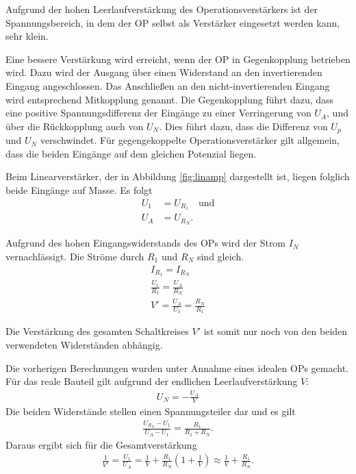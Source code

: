 Aufgrund der hohen Leerlaufverstärkung des Operationsverstärkers ist der Spannungsbereich, in dem der OP selbst als Verstärker eingesetzt werden kann, sehr klein.

Eine bessere Verstärkung wird erreicht, wenn der OP in Gegenkopplung betrieben wird.
Dazu wird der Ausgang über einen Widerstand an den invertierenden Eingang angeschlossen.
Das Anschließen an den nicht-invertierenden Eingang wird entsprechend Mitkopplung genannt.
Die Gegenkopplung führt dazu, dass eine positive Spannungsdifferenz der Eingänge zu einer Verringerung von $U_A$, und über die Rückkopplung auch von $U_N$.
Dies führt dazu, dass die Differenz von $U_p$ und $U_N$ verschwindet.
Für gegengekoppelte Operationsverstärker gilt allgemein, dass die beiden Eingänge auf dem gleichen Potenzial liegen.

Beim Linearverstärker, der in Abbildung \ref{fig:linamp} dargestellt ist, liegen folglich beide Eingänge auf Masse.
Es folgt
\begin{align}
	U_1 &= U_{R_1} \quad \text{und} \\
	U_A &= U_{R_N}.
\end{align}

Aufgrund des hohen Eingangswiderstands des OPs wird der Strom $I_N$ vernachlässigt.
Die Ströme durch $R_1$ und $R_N$ sind gleich.
\begin{align}
	I_{R_1} = I_{R_N} \\
	\frac{U_1}{R_1} = \frac{U_A}{R_N} \\
	V' = \frac{U_A}{U_1} = \frac{R_N}{R_1}
\end{align}

Die Verstärkung des gesamten Schaltkreises $V'$ ist somit nur noch von den beiden verwendeten Widerständen abhängig.

Die vorherigen Berechnungen wurden unter Annahme eines idealen OPs gemacht.
Für das reale Bauteil gilt aufgrund der endlichen Leerlaufverstärkung $V$:
\begin{align}
	U_N = -\frac{U_A}{V}
\end{align}
Die beiden Widerstände stellen einen Spannungsteiler dar und es gilt
\begin{align}
	\frac{U_{R_N} - U_1}{U_A - U_1} = \frac{R_1}{R_1 + R_N}.
\end{align}
Daraus ergibt sich für die Gesamtverstärkung
\begin{align}
	\frac{1}{V'} = \frac{U_1}{U_A} = \frac{1}{V} + \frac{R_1}{R_N} \left(1 + \frac{1}{V}\right) \approx \frac{1}{V} + \frac{R_1}{R_N}.
\end{align}

